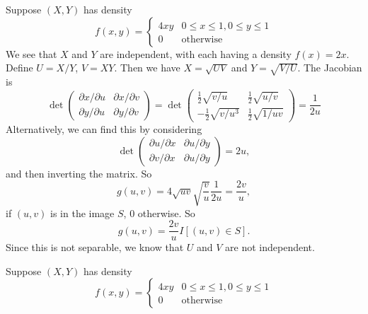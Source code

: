 \begin{note}
  \begin{field}
    \begin{eg}
      Suppose $(X, Y)$ has density
      \[
        f(x, y) =
        \begin{cases}
          4xy & 0 \leq x \leq 1, 0\leq y \leq 1\\
          0 & \text{otherwise}
        \end{cases}
      \]
      We see that $X$ and $Y$ are independent, with each having a density $f(x) = 2x$.
      Define $U = X/Y$, $V = XY$. Then we have $X = \sqrt{UV}$ and $Y = \sqrt{V/U}$.
      The Jacobian is
      \[
        \det
        \begin{pmatrix}
          \partial x/\partial u & \partial x/\partial v\\
          \partial y/\partial u & \partial y/\partial v
        \end{pmatrix}
        =
        \det
        \begin{pmatrix}
          \frac{1}{2}\sqrt{v/u} & \frac{1}{2}\sqrt{u/v}\\
          -\frac{1}{2}\sqrt{v/u^3} & \frac{1}{2}\sqrt{1/uv}
        \end{pmatrix}
        = \frac{1}{2u}
      \]
      Alternatively, we can find this by considering
      \[
        \det
        \begin{pmatrix}
          \partial u/\partial x & \partial u/\partial y\\
          \partial v/\partial x & \partial u/\partial y
        \end{pmatrix} = 2u,
      \]
      and then inverting the matrix. So
      \[
        g(u, v) = 4\sqrt{uv}\sqrt{\frac{v}{u}}\frac{1}{2u} = \frac{2v}{u},
      \]
      if $(u, v)$ is in the image $S$, $0$ otherwise. So
      \[
        g(u, v) = \frac{2v}{u}I[(u, v)\in S].
      \]
      Since this is not separable, we know that $U$ and $V$ are not independent.
    \end{eg}
  \end{field}
  \begin{field}
    \begin{eg}
      Suppose $(X, Y)$ has density
      \[
        f(x, y) =
        \begin{cases}
          4xy & 0 \leq x \leq 1, 0\leq y \leq 1\\
          0 & \text{otherwise}
        \end{cases}
      \]

\end{eg}
\end{field}
\end{note}
